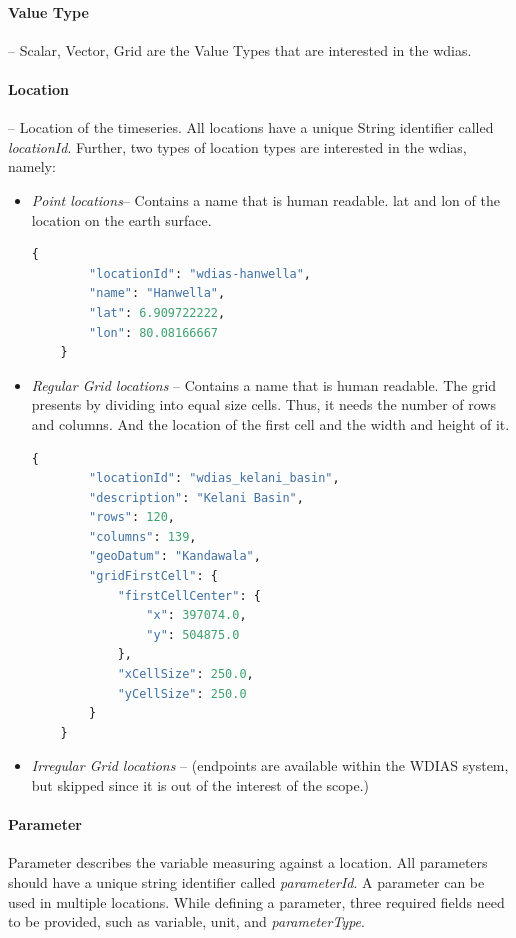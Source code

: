 \paragraph{Value Type}-- Scalar, Vector, Grid are the Value Types that are interested in the \acrshort{wdias}.

\paragraph{Location}-- Location of the timeseries. All locations have a unique String identifier called \emph{locationId}. Further, two types of location types are interested in the \acrshort{wdias}, namely:
\begin{itemize}
  \item \emph{Point locations}-- Contains a name that is human readable. lat and lon of the location on the earth surface.
  \begin{lstlisting}[language=Python, lastline=-1]
    {
        "locationId": "wdias-hanwella",
        "name": "Hanwella",
        "lat": 6.909722222,
        "lon": 80.08166667
    }
  \end{lstlisting}
  \item \emph{Regular Grid locations} -- Contains a name that is human readable. The grid presents by dividing into equal size cells. Thus, it needs the number of rows and columns. 
  And the location of the first cell and the width and height of it.
  \begin{lstlisting}[language=Python]
      {
        "locationId": "wdias_kelani_basin",
        "description": "Kelani Basin",
        "rows": 120,
        "columns": 139,
        "geoDatum": "Kandawala",
        "gridFirstCell": {
            "firstCellCenter": {
                "x": 397074.0,
                "y": 504875.0
            },
            "xCellSize": 250.0,
            "yCellSize": 250.0
        }
    }
  \end{lstlisting}
  \item \emph{Irregular Grid locations} -- (endpoints are available within the WDIAS system, but skipped since it is out of the interest of the scope.)
\end{itemize}

\paragraph{Parameter}
Parameter describes the variable measuring against a location. All parameters should have a unique string identifier called \emph{parameterId}. A parameter can be used in multiple locations. While defining a parameter, three required fields need to be provided, such as variable, unit, and \emph{parameterType}.

